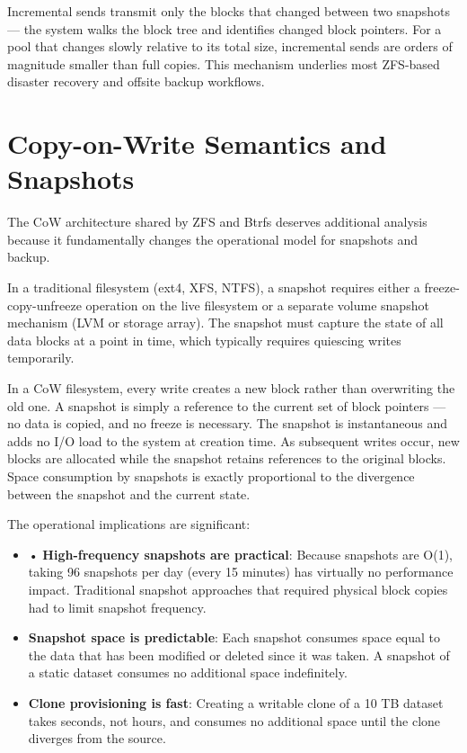 Incremental sends transmit only the blocks that changed between two snapshots --- the system walks the block tree and identifies changed block pointers. For a pool that changes slowly relative to its total size, incremental sends are orders of magnitude smaller than full copies. This mechanism underlies most ZFS-based disaster recovery and offsite backup workflows.

\section{Copy-on-Write Semantics and Snapshots}
The CoW architecture shared by ZFS and Btrfs deserves additional analysis because it fundamentally changes the operational model for snapshots and backup.

In a traditional filesystem (ext4, XFS, NTFS), a snapshot requires either a freeze-copy-unfreeze operation on the live filesystem or a separate volume snapshot mechanism (LVM or storage array). The snapshot must capture the state of all data blocks at a point in time, which typically requires quiescing writes temporarily.

In a CoW filesystem, every write creates a new block rather than overwriting the old one. A snapshot is simply a reference to the current set of block pointers --- no data is copied, and no freeze is necessary. The snapshot is instantaneous and adds no I/O load to the system at creation time. As subsequent writes occur, new blocks are allocated while the snapshot retains references to the original blocks. Space consumption by snapshots is exactly proportional to the divergence between the snapshot and the current state.

The operational implications are significant:

\begin{itemize}
  \item • \textbf{High-frequency snapshots are practical}: Because snapshots are O(1), taking 96 snapshots per day (every 15 minutes) has virtually no performance impact. Traditional snapshot approaches that required physical block copies had to limit snapshot frequency.
  \item \textbf{Snapshot space is predictable}: Each snapshot consumes space equal to the data that has been modified or deleted since it was taken. A snapshot of a static dataset consumes no additional space indefinitely.
  \item \textbf{Clone provisioning is fast}: Creating a writable clone of a 10 TB dataset takes seconds, not hours, and consumes no additional space until the clone diverges from the source.
\end{itemize}

